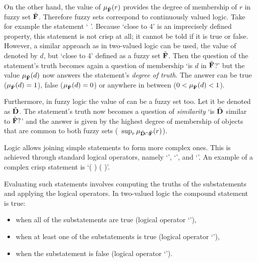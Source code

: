 On the other hand, the value of $\mu_{\tilde{{\mathbf{F}}}}(r)$ provides the degree of membership of $r$ in fuzzy set ${\tilde{{\mathbf{F}}}}$. Therefore fuzzy sets correspond to continuously valued logic. Take for example the statement `  '. Because `close to 4' is an imprecisely defined property, this statement is not crisp at all; it cannot be told if it is true or false. However, a similar approach as in two-valued logic can be used, the value of  denoted by $d$, but `close to 4' defined as a fuzzy set ${\tilde{{\mathbf{F}}}}$. Then the question of the statement's truth becomes again a question of membership `is $d$ in ${\tilde{{\mathbf{F}}}}$?' but the value $\mu_{\tilde{{\mathbf{F}}}}(d)$ now answers the statement's \emph{degree of truth}. The answer can be true ($\mu_{\tilde{{\mathbf{F}}}}(d)=1$), false ($\mu_{\tilde{{\mathbf{F}}}}(d)=0$) or anywhere in between ($0<\mu_{\tilde{{\mathbf{F}}}}(d)<1$). 

Furthermore, in fuzzy logic the value of  can be a fuzzy set too. Let it be denoted as ${\tilde{{\mathbf{D}}}}$. The statement's truth now becomes a question of \emph{similarity} `is ${\tilde{{\mathbf{D}}}}$ similar to ${\tilde{{\mathbf{F}}}}?$' and the answer is given by the highest degree of membership of objects that are common to both fuzzy sets (\ie\ $\sup_r\mu_{{\tilde{{\mathbf{D}}}} \cap {\ensuremath{\tilde{{\mathbf{F}}}}}}(r)$).

Logic allows joining simple statements to form more complex ones. This is achieved through standard logical operators, namely `', `', and `'. An example of a complex crisp statement is `(  )  (  )'. 

Evaluating such statements involves computing the truths of the substatements and applying the logical operators. In two-valued logic the compound statement is true: 

\begin{itemize}
\item when all of the substatements are true (logical operator `'), 
\item when at least one of the substatements is true (logical operator `'), 
\item when the substatement is false (logical operator `').
\end{itemize}

